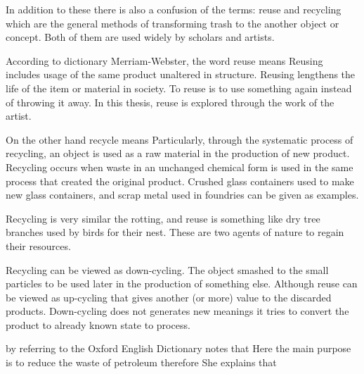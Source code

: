 In addition to these there is also a confusion of the terms: reuse and recycling which are the general methods of transforming trash to the another object or concept. Both of them are used widely by scholars and artists.

According to dictionary Merriam-Webster, the word reuse means  Reusing includes usage of the same product unaltered in structure. Reusing lengthens the life of the item or material in society. To reuse is to use something again instead of throwing it away. In this thesis, reuse is explored through the work of the artist.

On the other hand recycle means  Particularly, through the systematic process of recycling, an object is used as a raw material in the production of new product. Recycling occurs when waste in an unchanged chemical form is used in the same process that created the original product. Crushed glass containers used to make new glass containers, and scrap metal used in foundries can be given as examples.

Recycling is very similar the rotting, and reuse is something like dry tree branches used by birds for their nest. These are two agents of nature to regain their resources.

Recycling can be viewed as down-cycling. The object smashed to the small particles to be used later in the production of something else. Although reuse can be viewed as up-cycling that gives another (or more) value to the discarded products. Down-cycling does not generates new meanings it tries to convert the product to already known state to process. 

\citet[72]{strasser1999waste} by referring to the Oxford English Dictionary notes that  Here the main purpose is to reduce the waste of petroleum therefore  She explains that 

